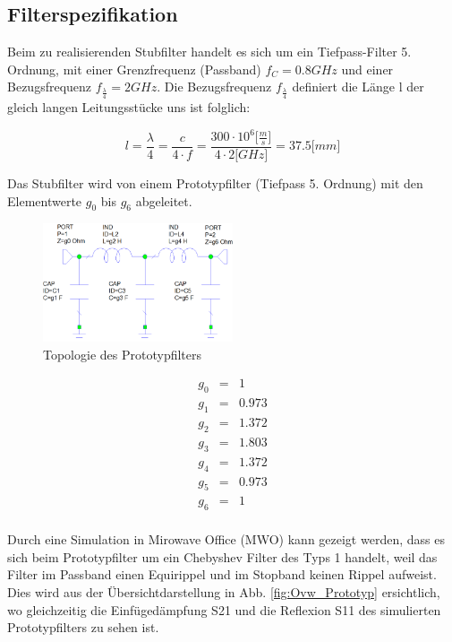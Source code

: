 \subsection{Filterspezifikation}

Beim zu realisierenden Stubfilter handelt es sich um ein Tiefpass-Filter 5. Ordnung, mit einer Grenzfrequenz (Passband) $f_C = 0.8GHz $ und einer Bezugsfrequenz $f_{\frac{\lambda}{4}} = 2GHz$. Die Bezugsfrequenz $f_{\frac{\lambda}{4}}$ definiert die Länge l der gleich langen Leitungsstücke uns ist folglich:

\begin{equation*}
l = \frac{\lambda}{4} = \frac{c}{4 \cdot f} = \frac{300\cdot 10^6 \lbrack\frac{m}{s}\rbrack}{4 \cdot 2 \lbrack GHz \rbrack} =37.5 \lbrack mm \rbrack
\end{equation*}

Das Stubfilter wird von einem Prototypfilter (Tiefpass 5. Ordnung) 
mit den Elementwerte $g_0$ bis $g_6$ abgeleitet.

\begin{figure}[h!]
\centering
 	\includegraphics[width=0.5\textwidth]{Topologie_Prototyp.png}
 	\caption{Topologie des Prototypfilters}
 	\label{fig:Topologie_Prototyp.png}
\end{figure}

\begin{mdframed}
\begin{equation*} 
\begin{array}{rclcl} 
g_0 & = & 1 \\ 
g_1 & = & 0.973 \\ 
g_2 & = & 1.372 \\ 
g_3 & = & 1.803 \\ 
g_4 & = & 1.372 \\ 
g_5 & = & 0.973 \\ 
g_6 & = & 1 \\ 
\end{array} 
\end{equation*} 
\end{mdframed}

Durch eine Simulation in Mirowave Office (MWO) kann gezeigt werden, dass es sich beim Prototypfilter um ein Chebyshev Filter des Typs 1 handelt, weil das Filter im Passband einen Equirippel und im Stopband keinen Rippel aufweist. Dies wird aus der Übersichtdarstellung in Abb. \ref{fig:Ovw_Prototyp} ersichtlich, wo gleichzeitig die Einfügedämpfung S21 und die Reflexion S11 des simulierten Prototypfilters zu sehen ist.

